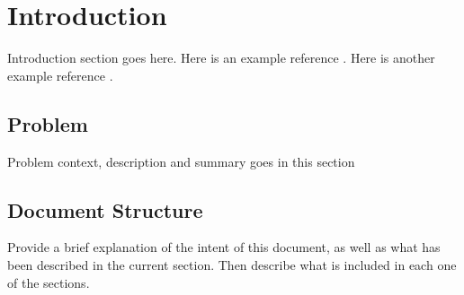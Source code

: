 \chapter{Introduction}
\label{chapter:introduction}


Introduction section goes here. Here is an example reference
\cite{examplereference}. Here is another example reference \cite{examplereference2}.

\newpage

\section{Problem}

Problem context, description and summary goes in this section

\section{Document Structure}

Provide a brief explanation of the intent of this document, as well as what has been described in the current section. Then describe what is included in each one of the sections. 



